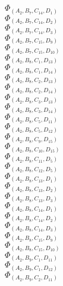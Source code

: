 \documentclass[14pt]{article}
\begin{document}
    $\Phi_{({A}_{2}, {B}_{7}, {C}_{14}, {D}_{1})}$ \\ 
    $\Phi_{({A}_{2}, {B}_{7}, {C}_{14}, {D}_{2})}$ \\ 
    $\Phi_{({A}_{2}, {B}_{7}, {C}_{14}, {D}_{3})}$ \\ 
    $\Phi_{({A}_{2}, {B}_{7}, {C}_{15}, {D}_{9})}$ \\ 
    $\Phi_{({A}_{2}, {B}_{7}, {C}_{15}, {D}_{10})}$ \\ 
    $\Phi_{({A}_{2}, {B}_{8}, {C}_{1}, {D}_{13})}$ \\ 
    $\Phi_{({A}_{2}, {B}_{8}, {C}_{1}, {D}_{14})}$ \\ 
    $\Phi_{({A}_{2}, {B}_{8}, {C}_{2}, {D}_{13})}$ \\ 
    $\Phi_{({A}_{2}, {B}_{8}, {C}_{2}, {D}_{14})}$ \\ 
    $\Phi_{({A}_{2}, {B}_{8}, {C}_{3}, {D}_{13})}$ \\ 
    $\Phi_{({A}_{2}, {B}_{8}, {C}_{3}, {D}_{14})}$ \\ 
    $\Phi_{({A}_{2}, {B}_{8}, {C}_{5}, {D}_{11})}$ \\ 
    $\Phi_{({A}_{2}, {B}_{8}, {C}_{5}, {D}_{12})}$ \\ 
    $\Phi_{({A}_{2}, {B}_{8}, {C}_{9}, {D}_{15})}$ \\ 
    $\Phi_{({A}_{2}, {B}_{8}, {C}_{10}, {D}_{15})}$ \\ 
    $\Phi_{({A}_{2}, {B}_{8}, {C}_{11}, {D}_{5})}$ \\ 
    $\Phi_{({A}_{2}, {B}_{8}, {C}_{12}, {D}_{5})}$ \\ 
    $\Phi_{({A}_{2}, {B}_{8}, {C}_{13}, {D}_{1})}$ \\ 
    $\Phi_{({A}_{2}, {B}_{8}, {C}_{13}, {D}_{2})}$ \\ 
    $\Phi_{({A}_{2}, {B}_{8}, {C}_{13}, {D}_{3})}$ \\ 
    $\Phi_{({A}_{2}, {B}_{8}, {C}_{14}, {D}_{1})}$ \\ 
    $\Phi_{({A}_{2}, {B}_{8}, {C}_{14}, {D}_{2})}$ \\ 
    $\Phi_{({A}_{2}, {B}_{8}, {C}_{14}, {D}_{3})}$ \\ 
    $\Phi_{({A}_{2}, {B}_{8}, {C}_{15}, {D}_{9})}$ \\ 
    $\Phi_{({A}_{2}, {B}_{8}, {C}_{15}, {D}_{10})}$ \\ 
    $\Phi_{({A}_{2}, {B}_{9}, {C}_{1}, {D}_{11})}$ \\ 
    $\Phi_{({A}_{2}, {B}_{9}, {C}_{1}, {D}_{12})}$ \\ 
    $\Phi_{({A}_{2}, {B}_{9}, {C}_{2}, {D}_{11})}$ \\ 
\end{document}
